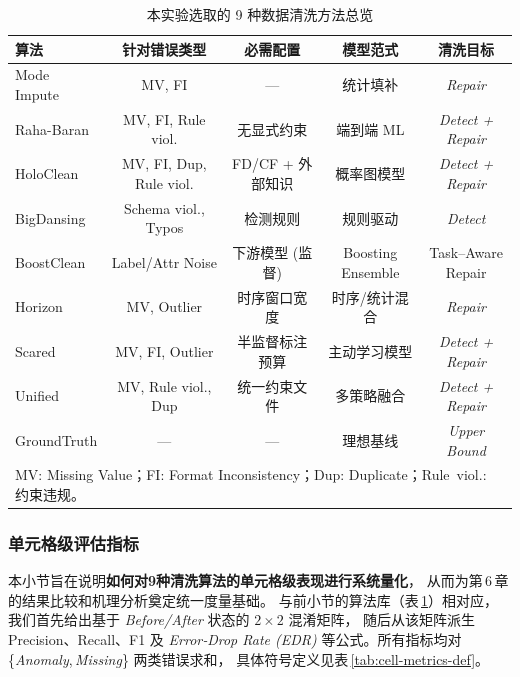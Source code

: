 \documentclass[10pt]{article} %
\numberwithin{equation}{section}
\begin{document}
\begin{table}[t]
\centering\small
\renewcommand{\arraystretch}{1.2}
\setlength{\tabcolsep}{6pt}
\caption{本实验选取的 9 种数据清洗方法总览}
\begin{tabular}{@{}lcccc@{}}
\toprule
\textbf{算法} & \textbf{针对错误类型} & \textbf{必需配置} &
\textbf{模型范式} & \textbf{清洗目标} \\
\midrule
Mode Impute & MV, FI & — &
统计填补 & \textit{Repair} \\

Raha-Baran & MV, FI, Rule viol. & 无显式约束 &
端到端 ML & \textit{Detect + Repair} \\

HoloClean & MV, FI, Dup, Rule viol. &
FD/CF + 外部知识 &
概率图模型 & \textit{Detect + Repair} \\

BigDansing & Schema viol., Typos &
检测规则 & 规则驱动 & \textit{Detect} \\

BoostClean & Label/Attr Noise &
下游模型 (监督) &
Boosting Ensemble & Task–Aware Repair \\

Horizon & MV, Outlier &
时序窗口宽度 &
时序/统计混合 & \textit{Repair} \\

Scared & MV, FI, Outlier &
半监督标注预算 &
主动学习模型 & \textit{Detect + Repair} \\

Unified & MV, Rule viol., Dup &
统一约束文件 &
多策略融合 & \textit{Detect + Repair} \\

GroundTruth & — & — &
理想基线 & \textit{Upper Bound} \\
\bottomrule
\multicolumn{5}{l}{\footnotesize
MV: Missing Value；FI: Format Inconsistency；Dup: Duplicate；Rule~viol.: 约束违规。}
\end{tabular}
\label{tab:clean_algo_overview}
\end{table}

\vspace{-1em}
\subsubsection{单元格级评估指标}\label{sec:metrics}
\textcolor[rgb]{0.00,0.07,1.00}{本小节旨在说明\textbf{如何对9种清洗算法的单元格级表现进行系统量化}，
从而为第 6 章的结果比较和机理分析奠定统一度量基础。
与前小节的算法库（表 \ref{tab:clean_algo_overview}）相对应，
我们首先给出基于 \emph{Before/After} 状态的 $2\times2$ 混淆矩阵，
随后从该矩阵派生 Precision、Recall、F1 及
\emph{Error‑Drop Rate (EDR)} 等公式。所有指标均对
\{\textit{Anomaly},\,\textit{Missing}\} 两类错误求和，
具体符号定义见表 \ref{tab:cell-metrics-def}。}
\end{document}
